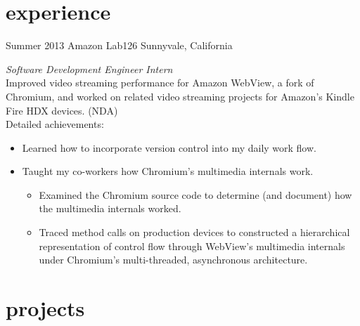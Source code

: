 \documentclass[]{mills-cv} %
\begin{document}

\section{experience}

\begin{entrylist}
\entry
{Summer 2013}
{Amazon Lab126}
{Sunnyvale, California}
{\emph{Software Development Engineer Intern} \\
Improved video streaming performance for Amazon WebView, a fork of Chromium, and worked on related video streaming projects for Amazon's Kindle Fire HDX devices. (NDA) \\
Detailed achievements:
\begin{itemize}
\item Learned how to incorporate version control into my daily work flow.
\item Taught my co-workers how Chromium's multimedia internals work.
\begin{itemize}
\item Examined the Chromium source code to determine (and document) how the multimedia internals worked.
\item Traced method calls on production devices to constructed a hierarchical representation of control flow through WebView's multimedia internals under Chromium's multi-threaded, asynchronous architecture.
\end{itemize}
\end{itemize}}
\end{entrylist}

\section{projects}
\end{document}
